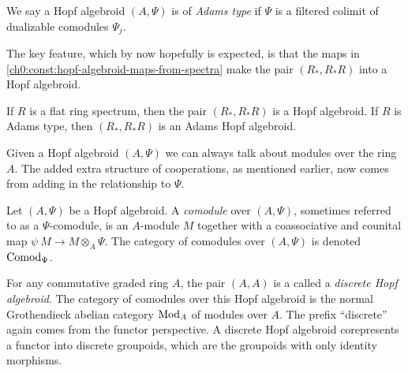 \begin{definition}
    \label{ch0:def:adams-hopf-algebroid}
    We say a Hopf algebroid $(A, \Psi)$ is of \emph{Adams type} if $\Psi$ is a filtered colimit of dualizable comodules $\Psi_j$. 
\end{definition}

The key feature, which by now hopefully is expected, is that the maps in \cref{ch0:const:hopf-algebroid-maps-from-spectra} make the pair $(R_*, R_*R)$ into a Hopf algebroid. 

\begin{proposition}
    \label{ch0:prop:hopf-algebroid-from-spectra}
    If $R$ is a flat ring spectrum, then the pair $(R_*, R_*R)$ is a Hopf algebroid. If $R$ is Adams type, then $(R_*, R_*R)$ is an Adams Hopf algebroid. 
\end{proposition}

Given a Hopf algebroid $(A,\Psi)$ we can always talk about modules over the ring $A$. The added extra structure of cooperations, as mentioned earlier, now comes from adding in the relationship to $\Psi$. 

\begin{definition}
    \label{ch0:def:comodule-over-hopf-algebroid}
    Let $(A, \Psi)$ be a Hopf algebroid. A \emph{comodule} over $(A, \Psi)$, sometimes referred to as a $\Psi$-comodule, is an $A$-module $M$ together with a coassociative and counital map $\psi\: M\longrightarrow M\otimes_A \Psi$. The category of comodules over $(A, \Psi)$ is denoted \emph{$\mathrm{Comod}_\Psi$}. 
\end{definition}

\begin{example}
    \label{ch0:ex:modules-as-discrete-Hopf-algebroids}
    For any commutative graded ring $A$, the pair $(A, A)$ is a called a \emph{discrete Hopf algebroid}. The category of comodules over this Hopf algebroid is the normal Grothendieck  abelian category $\mathrm{Mod}_A$ of modules over $A$. The prefix ``discrete'' again comes from the functor perspective. A discrete Hopf algebroid corepresents a functor into discrete groupoids, which are the groupoids with only identity morphisms. 
\end{example}

